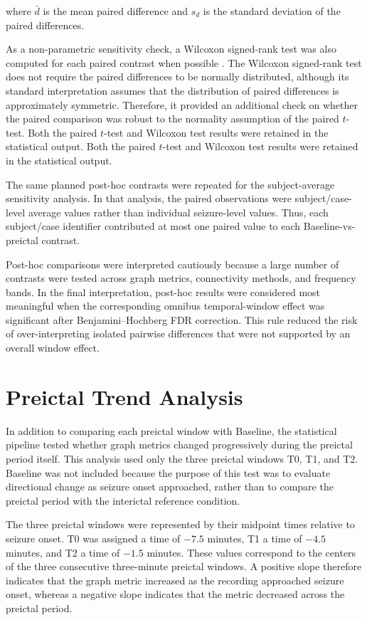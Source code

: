 where $\bar{d}$ is the mean paired difference and $s_d$ is the standard
deviation of the paired differences.

As a non-parametric sensitivity check, a Wilcoxon signed-rank test was also
computed for each paired contrast when possible \cite{Wilcoxon1945}. The
Wilcoxon signed-rank test does not require the paired differences to be normally
distributed, although its standard interpretation assumes that the distribution
of paired differences is approximately symmetric. Therefore, it provided an
additional check on whether the paired comparison was robust to the normality
assumption of the paired $t$-test. Both the paired $t$-test and Wilcoxon test
results were retained in the statistical output. 
Both the paired $t$-test and Wilcoxon test results were retained
in the statistical output.

The same planned post-hoc contrasts were repeated for the subject-average
sensitivity analysis. In that analysis, the paired observations were
subject/case-level average values rather than individual seizure-level values.
Thus, each subject/case identifier contributed at most one paired value to each
Baseline-vs-preictal contrast.

Post-hoc comparisons were interpreted cautiously because a large number of
contrasts were tested across graph metrics, connectivity methods, and frequency
bands. In the final interpretation, post-hoc results were considered most
meaningful when the corresponding omnibus temporal-window effect was
significant after Benjamini--Hochberg FDR correction. This rule reduced the risk
of over-interpreting isolated pairwise differences that were not supported by
an overall window effect.

\section{Preictal Trend Analysis}
\label{sec:preictal-trend-analysis}

In addition to comparing each preictal window with Baseline, the statistical
pipeline tested whether graph metrics changed progressively during the
preictal period itself. This analysis used only the three preictal windows T0,
T1, and T2. Baseline was not included because the purpose of this test was to
evaluate directional change as seizure onset approached, rather than to compare
the preictal period with the interictal reference condition.

The three preictal windows were represented by their midpoint times relative to
seizure onset. T0 was assigned a time of \(-7.5\) minutes, T1 a time of
\(-4.5\) minutes, and T2 a time of \(-1.5\) minutes. These values correspond to
the centers of the three consecutive three-minute preictal windows. A positive
slope therefore indicates that the graph metric increased as the recording
approached seizure onset, whereas a negative slope indicates that the metric
decreased across the preictal period.

